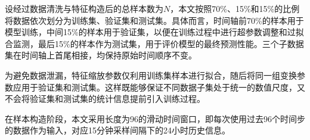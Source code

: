 设经过数据清洗与特征构造后的总样本数为$N$，本文按照70\%、15\%和15\%的比例将数据依次划分为训练集、验证集和测试集。具体而言，时间轴前70\%的样本用于模型训练，中间15\%的样本用于验证集，以便在训练过程中进行超参数调整和过拟合监测，最后15\%的样本作为测试集，用于评价模型的最终预测性能。三个子数据集在时间轴上首尾相接，均保持原始时间顺序不变。

为避免数据泄漏，特征缩放参数仅利用训练集样本进行拟合，随后将同一组变换参数应用于验证集和测试集。这样既能够保证不同数据子集处于统一的数值尺度，又不会将验证集和测试集的统计信息提前引入训练过程。

在样本构造阶段，本文采用长度为96的滑动时间窗口，即每次使用过去96个时间步的数据作为输入，对应15分钟采样间隔下的24小时历史信息。

